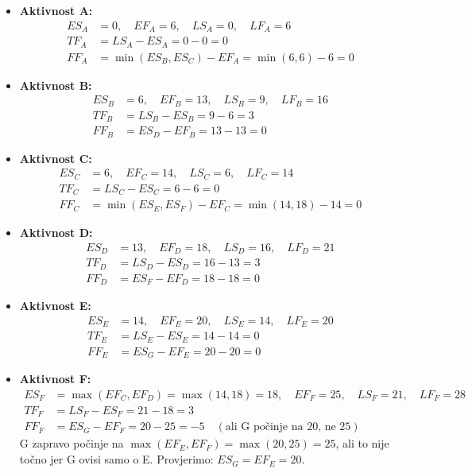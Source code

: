 \documentclass[12pt,a4paper]{article}
\begin{document}
\begin{itemize}
\item \textbf{Aktivnost A:}
  \begin{align}
  ES_A &= 0, \quad EF_A = 6, \quad LS_A = 0, \quad LF_A = 6 \\
  TF_A &= LS_A - ES_A = 0 - 0 = 0 \\
  FF_A &= \min(ES_B, ES_C) - EF_A = \min(6, 6) - 6 = 0
  \end{align}

\item \textbf{Aktivnost B:}
  \begin{align}
  ES_B &= 6, \quad EF_B = 13, \quad LS_B = 9, \quad LF_B = 16 \\
  TF_B &= LS_B - ES_B = 9 - 6 = 3 \\
  FF_B &= ES_D - EF_B = 13 - 13 = 0
  \end{align}

\item \textbf{Aktivnost C:}
  \begin{align}
  ES_C &= 6, \quad EF_C = 14, \quad LS_C = 6, \quad LF_C = 14 \\
  TF_C &= LS_C - ES_C = 6 - 6 = 0 \\
  FF_C &= \min(ES_E, ES_F) - EF_C = \min(14, 18) - 14 = 0
  \end{align}

\item \textbf{Aktivnost D:}
  \begin{align}
  ES_D &= 13, \quad EF_D = 18, \quad LS_D = 16, \quad LF_D = 21 \\
  TF_D &= LS_D - ES_D = 16 - 13 = 3 \\
  FF_D &= ES_F - EF_D = 18 - 18 = 0
  \end{align}

\item \textbf{Aktivnost E:}
  \begin{align}
  ES_E &= 14, \quad EF_E = 20, \quad LS_E = 14, \quad LF_E = 20 \\
  TF_E &= LS_E - ES_E = 14 - 14 = 0 \\
  FF_E &= ES_G - EF_E = 20 - 20 = 0
  \end{align}

\item \textbf{Aktivnost F:}
  \begin{align}
  ES_F &= \max(EF_C, EF_D) = \max(14, 18) = 18, \quad EF_F = 25, \quad LS_F = 21, \quad LF_F = 28 \\
  TF_F &= LS_F - ES_F = 21 - 18 = 3 \\
  FF_F &= ES_G - EF_F = 20 - 25 = -5 \quad (\text{ali G počinje na 20, ne 25})
  \end{align}
  G zapravo počinje na $\max(EF_E, EF_F) = \max(20, 25) = 25$, ali to nije točno jer G ovisi samo o E. Provjerimo: $ES_G = EF_E = 20$.


\end{itemize}
\end{document}
